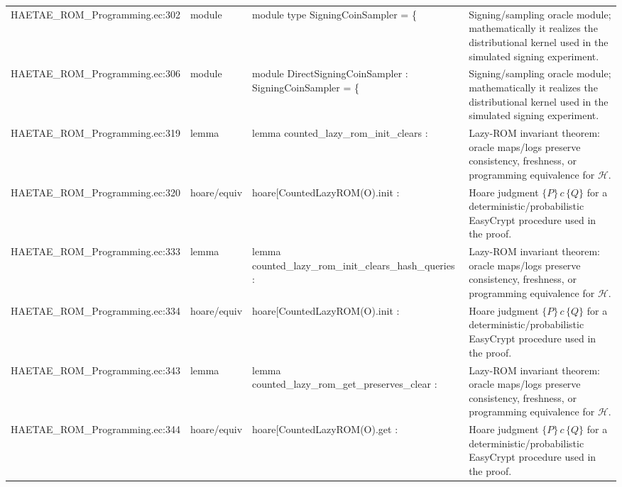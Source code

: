 \documentclass[10pt]{article}
\begin{document}
\begin{longtable}{L{0.11\textwidth}L{0.055\textwidth}L{0.385\textwidth}L{0.41\textwidth}}
HAETAE\_\allowbreak{}ROM\_\allowbreak{}Programming.\allowbreak{}ec:\allowbreak{}302 & module & {\ttfamily\scriptsize module type SigningCoinSampler = \{} & Signing/sampling oracle module; mathematically it realizes the distributional kernel used in the simulated signing experiment. \\
HAETAE\_\allowbreak{}ROM\_\allowbreak{}Programming.\allowbreak{}ec:\allowbreak{}306 & module & {\ttfamily\scriptsize module DirectSigningCoinSampler : SigningCoinSampler = \{} & Signing/sampling oracle module; mathematically it realizes the distributional kernel used in the simulated signing experiment. \\
HAETAE\_\allowbreak{}ROM\_\allowbreak{}Programming.\allowbreak{}ec:\allowbreak{}319 & lemma & {\ttfamily\scriptsize lemma counted\_\allowbreak{}lazy\_\allowbreak{}rom\_\allowbreak{}init\_\allowbreak{}clears :} & Lazy-ROM invariant theorem: oracle maps/logs preserve consistency, freshness, or programming equivalence for $\mathcal H$. \\
HAETAE\_\allowbreak{}ROM\_\allowbreak{}Programming.\allowbreak{}ec:\allowbreak{}320 & hoare/equiv & {\ttfamily\scriptsize hoare[CountedLazyROM(O).init :} & Hoare judgment $\{P\}\,c\,\{Q\}$ for a deterministic/probabilistic EasyCrypt procedure used in the proof. \\
HAETAE\_\allowbreak{}ROM\_\allowbreak{}Programming.\allowbreak{}ec:\allowbreak{}333 & lemma & {\ttfamily\scriptsize lemma counted\_\allowbreak{}lazy\_\allowbreak{}rom\_\allowbreak{}init\_\allowbreak{}clears\_\allowbreak{}hash\_\allowbreak{}queries :} & Lazy-ROM invariant theorem: oracle maps/logs preserve consistency, freshness, or programming equivalence for $\mathcal H$. \\
HAETAE\_\allowbreak{}ROM\_\allowbreak{}Programming.\allowbreak{}ec:\allowbreak{}334 & hoare/equiv & {\ttfamily\scriptsize hoare[CountedLazyROM(O).init :} & Hoare judgment $\{P\}\,c\,\{Q\}$ for a deterministic/probabilistic EasyCrypt procedure used in the proof. \\
HAETAE\_\allowbreak{}ROM\_\allowbreak{}Programming.\allowbreak{}ec:\allowbreak{}343 & lemma & {\ttfamily\scriptsize lemma counted\_\allowbreak{}lazy\_\allowbreak{}rom\_\allowbreak{}get\_\allowbreak{}preserves\_\allowbreak{}clear :} & Lazy-ROM invariant theorem: oracle maps/logs preserve consistency, freshness, or programming equivalence for $\mathcal H$. \\
HAETAE\_\allowbreak{}ROM\_\allowbreak{}Programming.\allowbreak{}ec:\allowbreak{}344 & hoare/equiv & {\ttfamily\scriptsize hoare[CountedLazyROM(O).get :} & Hoare judgment $\{P\}\,c\,\{Q\}$ for a deterministic/probabilistic EasyCrypt procedure used in the proof. \\

\end{longtable}
\end{document}
